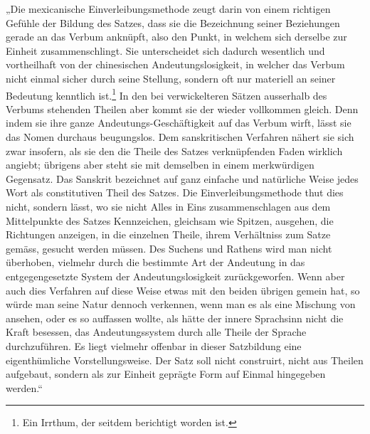 „Die mexicanische Einverleibungsmethode zeugt darin von einem richtigen Gefühle der Bildung des Satzes, dass sie die Bezeichnung seiner Beziehungen gerade an das Verbum anknüpft, also den Punkt, in welchem sich derselbe zur Einheit zusammenschlingt. Sie unterscheidet sich dadurch wesentlich und vortheilhaft von der chinesischen Andeutungslosigkeit, in welcher das Verbum nicht einmal sicher durch seine Stellung, sondern oft nur materiell an seiner Bedeutung kenntlich ist.\footnote{Ein Irrthum, der seitdem berichtigt worden ist.} In den bei verwickelteren Sätzen ausserhalb des Verbums stehenden Theilen aber kommt sie der   wieder vollkommen gleich. Denn indem sie ihre ganze Andeutungs-Geschäftigkeit auf das Verbum wirft, lässt sie das Nomen durchaus beugungslos. Dem sanskritischen Verfahren nähert sie sich zwar insofern, als sie den die Theile des Satzes verknüpfenden Faden wirklich angiebt; übrigens aber steht sie mit demselben in einem merkwürdigen Gegensatz. Das Sanskrit bezeichnet auf ganz einfache und natürliche Weise jedes Wort als constitutiven Theil des Satzes. Die Einverleibungsmethode thut dies nicht, sondern lässt, wo sie nicht Alles in Eins zusammenschlagen  aus dem Mittelpunkte des Satzes Kennzeichen, gleichsam wie Spitzen, ausgehen, die Richtungen anzeigen, in  die einzelnen Theile, ihrem Verhältniss zum Satze gemäss, gesucht werden müssen. Des Suchens und Rathens wird man nicht überhoben, vielmehr durch die bestimmte Art der Andeutung in das \label{sp.357} entgegengesetzte System der Andeutungslosigkeit zurückgeworfen. Wenn aber auch dies Verfahren auf diese Weise etwas mit den beiden übrigen \label{fp.339} gemein hat, so würde man seine Natur dennoch verkennen, wenn man es als eine Mischung von  ansehen, oder es so auffassen  wollte, als hätte der innere Sprachsinn nicht die Kraft besessen, das Andeutungssystem durch alle Theile der Sprache durchzuführen. Es liegt vielmehr offenbar in dieser  Satzbildung eine eigenthümliche Vorstellungsweise. Der Satz soll nicht construirt, nicht aus Theilen  aufgebaut, sondern als zur Einheit geprägte Form auf Einmal hingegeben werden.“

